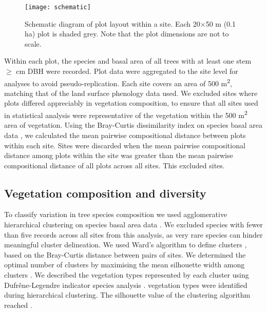 \documentclass[11pt,a4paper]{article}
\begin{document}
\begin{figure}[H]
\centering
	\texttt{[image: schematic]}
	\caption{Schematic diagram of plot layout within a site. Each 20$\times$50 m (0.1 ha) plot is shaded grey. Note that the plot dimensions are not to scale.}
	\label{schematic}
\end{figure}

Within each plot, the species and basal area of all trees with at least one stem $\geq$\stemSize{} cm DBH were recorded. Plot data were aggregated to the site level for analyses to avoid pseudo-replication. Each site covers an area of 500 m\textsuperscript{2}, matching that of the land surface phenology data used. We excluded sites where plots differed appreciably in vegetation composition, to ensure that all sites used in statistical analysis were representative of the vegetation within the 500 m\textsuperscript{2} area of vegetation. Using the Bray-Curtis dissimilarity index on species basal area data \citep{Faith1987}, we calculated the mean pairwise compositional distance between plots within each site. Sites were discarded when the mean pairwise compositional distance among plots within the site was greater than the mean pairwise compositional distance of all plots across all sites. This excluded \plotDistN{} sites.

\subsection{Vegetation composition and diversity} 

To classify variation in tree species composition we used agglomerative hierarchical clustering on species basal area data \citep{Kreft2010, Fayolle2014}. We excluded species with fewer than five records across all sites from this analysis, as very rare species can hinder meaningful cluster delineation. We used Ward's algorithm to define clusters \citep{Murtagh2014}, based on the Bray-Curtis distance between pairs of sites. We determined the optimal number of clusters by maximising the mean silhouette width among clusters \citep{Rousseeuw1987}. We described the vegetation types represented by each cluster using Dufr\^{e}ne-Legendre indicator species analysis \citep{Dufrene1997}. \Numberstringnum{\nCluster} vegetation types were identified during hierarchical clustering. The silhouette value of the clustering algorithm reached \silBest{}. 
\end{document}
